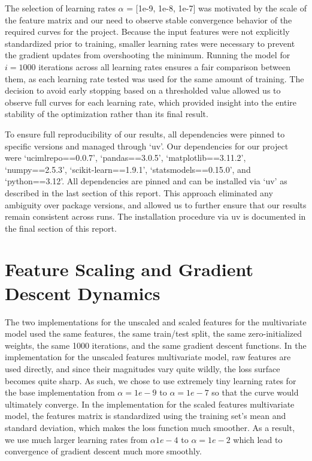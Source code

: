 \documentclass[12pt,letterpaper]{article}
\begin{document}
The selection of learning rates $\alpha$ = [1e-9, 1e-8, 1e-7] was motivated by the scale of the feature matrix and our need to observe stable convergence behavior of the required curves for the project. Because the input features were not explicitly standardized prior to training, smaller learning rates were necessary to prevent the gradient updates from overshooting the minimum. Running the model for $i=1000$ iterations across all learning rates ensures a fair comparison between them, as each learning rate tested was used for the same amount of training. The decision to avoid early stopping based on a thresholded value allowed us to observe full curves for each learning rate, which provided insight into the entire stability of the optimization rather than its final result.

To ensure full reproducibility of our results, all dependencies were pinned to specific versions and managed through `uv'. Our dependencies for our project were `ucimlrepo==0.0.7', `pandas==3.0.5', `matplotlib==3.11.2', `numpy==2.5.3', `scikit-learn==1.9.1', `statsmodels==0.15.0', and `python==3.12'. All dependencies are pinned and can be installed via `uv' as described in the last section of this report. This approach eliminated any ambiguity over package versions, and allowed us to further ensure that our results remain consistent across runs. The installation procedure via uv is documented in the final section of this report.

\newpage

\section{Feature Scaling and Gradient Descent Dynamics}


The two implementations for the unscaled and scaled features for the multivariate model used the same features, the same train/test split, the same zero-initialized weights, the same 1000 iterations, and the same gradient descent functions. In the implementation for the unscaled features multivariate model, raw features are used directly, and since their magnitudes vary quite wildly, the loss surface becomes quite sharp. As such, we chose to use extremely tiny learning rates for the base implementation from $\alpha = 1e-9$ to $\alpha = 1e-7$ so that the curve would ultimately converge. In the implementation for the scaled features multivariate model, the features matrix is standardized using the training set's mean and standard deviation, which makes the loss function much smoother. As a result, we use much larger learning rates from $\alpha 1e-4$ to $\alpha = 1e-2$ which lead to convergence of gradient descent much more smoothly.
\end{document}
